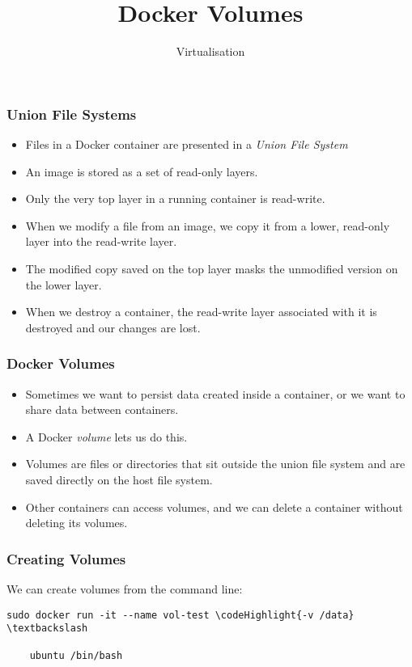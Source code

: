 \documentclass[10pt]{beamer}
\title{Docker Volumes}
\author[IN720]{Virtualisation}
\institute[Otago Polytechnic]{
  Otago Polytechnic \\
  Dunedin, New Zealand \\
}
\date{}
\newcommand\codeHighlight[1]{\textcolor[rgb]{1,0,0}{\textbf{#1}}}
\begin{document}
\begin{frame}[plain]
  \titlepage
\end{frame}


\begin{frame}
  \frametitle{Union File Systems}

 \begin{itemize}
  \item Files in a Docker container are presented in a \emph{Union File System}
  \item An image is stored as a set of read-only layers. 
  \item Only the very top layer in a running container is read-write.
  \item When we modify a file from an image, we copy it from a lower, read-only layer into the read-write layer.
  \item The modified copy saved on the top layer masks the unmodified version on the lower layer.
  \item When we destroy a container, the read-write layer associated with it is destroyed and our changes are lost.
  
  \end{itemize}
\end{frame}

\begin{frame}
	\frametitle{Docker Volumes}
	\begin{itemize}
		\item Sometimes we want to persist data created inside a container, or we want to share data between containers.
		\item A Docker \emph{volume} lets us do this.
		\item Volumes are files or directories that sit outside the union file system and are saved directly on the host file system.
		\item Other containers can access volumes, and we can delete a container without deleting its volumes.
	\end{itemize}
\end{frame}

\begin{frame}[fragile]
	\frametitle{Creating Volumes}
	We can create volumes from the command line:
	
	\begin{Verbatim}[commandchars=\\\{\}]
	sudo docker run -it --name vol-test \codeHighlight{-v /data} \textbackslash
	
	ubuntu /bin/bash
	\end{Verbatim}
\end{frame}
\end{document}
